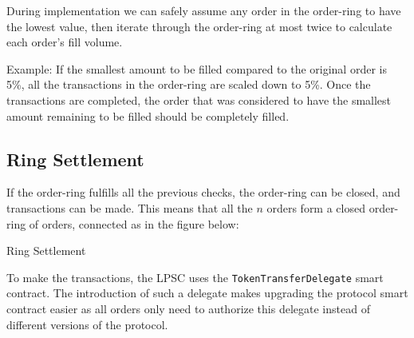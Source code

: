 \documentclass[UTF8,nofonts]{article}
\makeatletter
\newenvironment{figurehere}
 {\def\@captype{figure}}
 {}
\makeatother
\begin{document}
\begin{multicols}{2}
During implementation we can safely assume any order in the order-ring to have the lowest value, then iterate through the order-ring at most twice to calculate each order's fill volume. 

Example: If the smallest amount to be filled compared to the original order is 5\%, all the transactions in the order-ring are scaled down to 5\%. Once the transactions are completed, the order that was considered to have the smallest amount remaining to be filled should be completely filled.

\subsection{Ring Settlement\label{sec:settlement}}

If the order-ring fulfills all the previous checks, the order-ring can be closed, and transactions can be made. This means that all the $n$ orders form a closed order-ring of orders, connected as in the figure below:

\begin{center}
\begin{figurehere}
\centering
{}
\caption{Ring Settlement}
\label{fig:settlement}
\end{figurehere}
\end{center}

To make the transactions, the LPSC uses the \verb|TokenTransferDelegate| smart contract. The introduction of such a delegate makes upgrading the protocol smart contract easier as all orders only need to authorize this delegate instead of different versions of the protocol.


\end{multicols}
\end{document}
